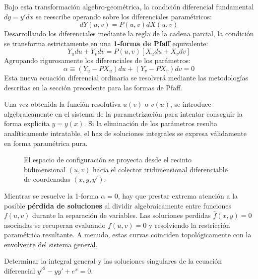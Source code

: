 Bajo esta transformación algebro-geométrica, la condición diferencial fundamental $dy = y'dx$ se reescribe operando sobre los diferenciales paramétricos:
$$ dY(u,v) = P(u,v)dX(u,v) $$
Desarrollando los diferenciales mediante la regla de la cadena parcial, la condición se transforma estrictamente en una \textbf{1-forma de Pfaff} equivalente:
$$ Y_u du + Y_v dv = P(u,v)[X_u du + X_v dv] $$
Agrupando rigurosamente los diferenciales de los parámetros:
$$
    \alpha \equiv (Y_u - P X_u)du + (Y_v - P X_v)dv = 0
$$
Esta nueva ecuación diferencial ordinaria se resolverá mediante las metodologías descritas en la sección precedente para las formas de Pfaff. 

Una vez obtenida la función resolutiva $u(v)$ o $v(u)$, se introduce algebraicamente en el sistema de la parametrización para intentar conseguir la forma explícita $y = y(x)$. Si la eliminación de los parámetros resulta analíticamente intratable, el haz de soluciones integrales se expresa válidamente en forma paramétrica pura.

\begin{figure}[H]
    \centering
    
    \caption{El espacio de configuración se proyecta desde el recinto bidimensional $(u,v)$ hacia el colector tridimensional diferenciable de coordenadas $(x, y, y')$.}
\end{figure}

\begin{observacion}
Mientras se resuelve la 1-forma $\alpha = 0$, hay que prestar extrema atención a la posible \textbf{pérdida de soluciones} al dividir algebraicamente entre funciones $f(u,v)$ durante la separación de variables. Las soluciones perdidas $\hat{f}(x,y) = 0$ asociadas se recuperan evaluando $f(u,v) = 0$ y resolviendo la restricción paramétrica resultante. A menudo, estas curvas coinciden topológicamente con la envolvente del sistema general.
\end{observacion}

\begin{ejercicio}
Determinar la integral general y las soluciones singulares de la ecuación diferencial $y'^2 - yy' + e^x = 0$.
\end{ejercicio}

